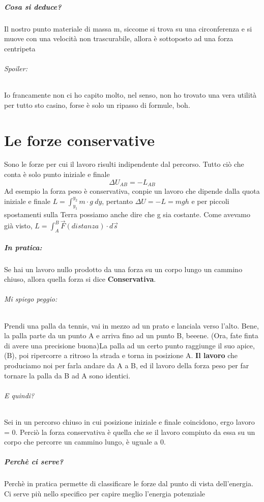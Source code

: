 \documentclass[12pt, a4paper, openany, oneside]{book}
\begin{document}
\paragraph{Cosa si deduce? }Il nostro punto materiale di massa m, siccome si 
trova su una circonferenza e si muove con una velocità non trascurabile, allora
è sottoposto ad una forza centripeta
\subparagraph{Spoiler: }Io francamente non ci ho capito molto, nel senso, non ho
trovato una vera utilità per tutto sto casino, forse è solo un ripasso di formule,
boh.	
\chapter{Le forze conservative}
Sono le forze per cui il lavoro risulti indipendente dal percorso. Tutto ciò
che conta è solo punto iniziale e finale
\[
\Delta U_{AB} = -L_{AB}
\]
Ad esempio la forza peso è conservativa, conpie un lavoro che dipende dalla 
quota iniziale e finale $L = \int_{y_{1}}^{y_{2}} m\cdot g ~ dy  $, pertanto
$ \Delta U = -L = mgh $ e per piccoli spostamenti sulla Terra possiamo anche
dire che g sia costante. 
Come avevamo già visto, $L = \int_{A}^{B} \overrightarrow{F}(distanza)\cdot d 
\overrightarrow{s}$
\paragraph{In pratica: }Se hai un lavoro nullo prodotto da una forza su un corpo
lungo un cammino chiuso, allora quella forza si dice \textbf{Conservativa}.
\subparagraph{Mi spiego peggio: }Prendi una palla da tennis, vai in mezzo ad un 
prato e lanciala verso l'alto. Bene, la palla parte da un punto A e arriva fino 
ad un punto B, beeene. (Ora, fate finta di avere una precisione buona)La palla 
ad un certo punto raggiunge il suo apice, (B), poi ripercorre a ritroso
la strada e torna in posizione A. \textbf{Il lavoro} che produciamo noi per 
farla andare da A a B, ed il lavoro della forza peso per far tornare la palla da
B ad A sono identici. 
\subparagraph{E quindi? }Sei in un percorso chiuso in cui posizione iniziale e 
finale coincidono, ergo lavoro = 0. Perciò la forza conservativa è quella che se
il lavoro compiuto da essa su un corpo che percorre un cammino lungo, è uguale a 0. 		
\paragraph{Perchè ci serve? }Perchè in pratica permette di classificare le forze
dal punto di vista dell'energia. Ci serve più nello specifico per capire meglio
l'energia potenziale
\end{document}
